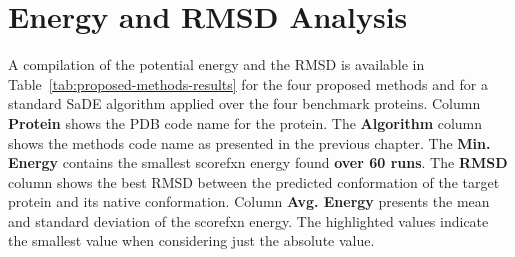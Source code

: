 \section{Energy and \ac{RMSD} Analysis}\label{sec:methods-analysis}






A compilation of the potential energy and the \ac{RMSD} is available in Table~\ref{tab:proposed-methods-results}
for the four proposed methods and for a standard \ac{SaDE} algorithm applied over the four benchmark proteins.
Column \textbf{Protein} shows the PDB code name for the protein. The \textbf{Algorithm} column
shows the methods code name as presented in the previous chapter. The \textbf{Min. Energy} contains
the smallest scorefxn energy found \textbf{over 60 runs}. The \textbf{RMSD} column shows the best \ac{RMSD} between
the predicted conformation of the target protein and its native conformation. Column \textbf{Avg. Energy}
presents the mean and standard deviation of the scorefxn energy. The highlighted values
indicate the smallest value when considering just the absolute value.

